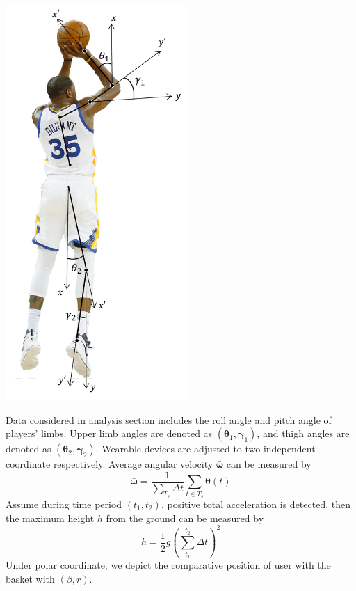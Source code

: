 \documentclass[12pt]{article}
\begin{document}
        \begin{minipage}[b]{0.50\linewidth}
        \includegraphics[height=15cm]{Shooting Skeleton_3.png}
        \end{minipage}
        Data considered in analysis section includes the roll angle and pitch angle of players' limbs. Upper limb angles are denoted as $(\bm{\theta}_1, \bm{\gamma}_1)$, and thigh angles are denoted as $(\bm{\theta}_2, \bm{\gamma}_2)$. Wearable devices are adjusted to two independent coordinate respectively. Average angular velocity $\bar{\bm{\omega}}$ can be measured by
        \begin{equation}
            \bar{\bm{\omega}} = \frac{1}{\sum_{T_s} \Delta t}\sum_{t \in T_s} \bm{\theta}(t)
        \end{equation}
        Assume during time period $(t_1, t_2)$, positive total acceleration is detected, then the maximum height $h$ from the ground can be measured by
        \begin{equation}
            h = \frac{1}{2} g \left( \sum_{t_1}^{t_2} \Delta t\right)^2
        \end{equation}
        Under polar coordinate, we depict the comparative position of user with the basket with $(\beta, r)$.
\end{document}
